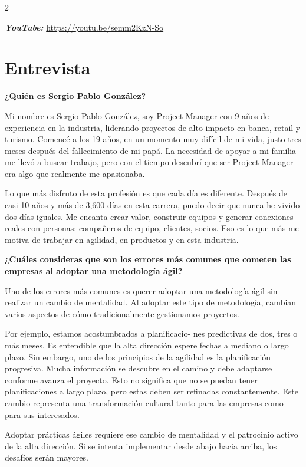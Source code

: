 \documentclass[12pt,spanish,Letterpaper,openany]{book}
\begin{document}
\begin {multicols}{2}

\textbf{\emph{YouTube:}} \url{https://youtu.be/semm2KzN-So}

\hypertarget{entrevista}{%
\section{Entrevista}\label{entrevista}}

\textbf{¿Quién es Sergio Pablo González?}

Mi nombre es Sergio Pablo González, soy Project Manager con 9 años de experiencia en la industria, liderando proyectos de alto impacto en banca, retail y turismo.
Comencé a los 19 años, en un momento muy difícil de mi vida, justo tres meses después del fallecimiento de mi papá. La necesidad de apoyar a mi familia me llevó a buscar trabajo, pero con el tiempo descubrí que ser Project Manager era algo que realmente me apasionaba.

Lo que más disfruto de esta profesión es que cada día es diferente. Después de casi 10 años y más de 3,600 días en esta carrera, puedo decir que nunca he vivido dos días iguales.
Me encanta crear valor, construir equipos y generar conexiones reales con personas: compañeros de equipo, clientes, socios. Eso es lo que más me motiva de trabajar en agilidad, en productos y en esta industria.

\textbf{¿Cuáles consideras que son los errores más comunes que cometen las empresas al adoptar una metodología ágil?}

Uno de los errores más comunes es querer adoptar una metodología ágil sin realizar un cambio de mentalidad. Al adoptar este tipo de metodología, cambian varios aspectos de cómo tradicionalmente gestionamos proyectos.

Por ejemplo, estamos acostumbrados a planificacio-
nes predictivas de dos, tres o más meses. Es entendible que la alta dirección espere fechas a mediano o largo plazo. Sin embargo, uno de los principios de la agilidad es la planificación progresiva. Mucha información se descubre en el camino y debe adaptarse conforme avanza el proyecto.
Esto no significa que no se puedan tener planificaciones a largo plazo, pero estas deben ser refinadas constantemente. Este cambio representa una transformación cultural tanto para las empresas como para sus interesados.

Adoptar prácticas ágiles requiere ese cambio de mentalidad y el patrocinio activo de la alta dirección. Si se intenta implementar desde abajo hacia arriba, los desafíos serán mayores.


\end{multicols}
\end{document}
